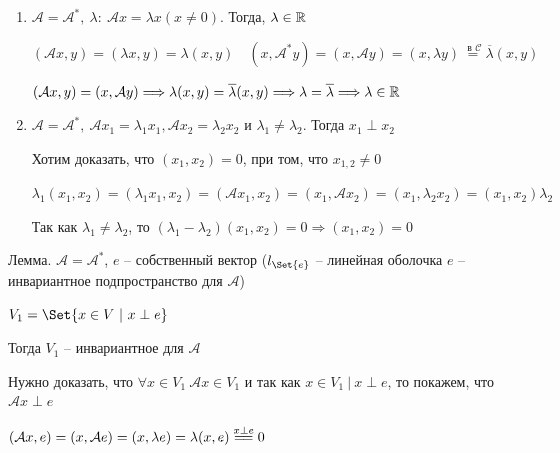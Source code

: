 \documentclass[12pt]{article}
\begin{document}
    \begin{enumerate}
        \item $\mathcal{A} = \mathcal{A}^*, \ \lambda : \ \mathcal{A}x = \lambda x (x \neq 0)$. Тогда, $\lambda \in \mathbb{R}$

        \begin{MyProof}
            $(\mathcal{A}x, y) = (\lambda x, y) = \lambda (x, y) \quad (x, \mathcal{A}^* y) = (x, \mathcal{A}y) = (x, \lambda y) \stackrel{\text{ в } \mathcal{C}}{=} \overline{\lambda} (x, y)$

            $(\mathcal{A}x, y) = (x, \mathcal{A}y) \Longrightarrow \lambda (x, y) = \overline{\lambda} (x, y) \Longrightarrow \lambda = \overline{\lambda} \Longrightarrow \lambda \in \mathbb{R}$

        \end{MyProof}

        \item $\mathcal{A} = \mathcal{A}^*, \ \mathcal{A}x_1 = \lambda_1 x_1, \mathcal{A}x_2 = \lambda_2 x_2$ и $\lambda_1 \neq \lambda_2$.
        Тогда $x_1 \perp x_2$

        \begin{MyProof}
            Хотим доказать, что $(x_1, x_2) = 0$, при том, что $x_{1,2} \neq 0$

            $\lambda_1 (x_1, x_2) = (\lambda_1 x_1, x_2) = (\mathcal{A} x_1, x_2) = (x_1, \mathcal{A} x_2) = (x_1, \lambda_2 x_2) = (x_1, x_2) \lambda_2$

            Так как $\lambda_1 \neq \lambda_2$, то $(\lambda_1 - \lambda_2) (x_1, x_2) = 0 \Longrightarrow (x_1, x_2) = 0$
        \end{MyProof}
    \end{enumerate}

    \hypertarget{lemmaabouteigenvectors}{}

    \begin{MyTheorem}
        \Ths Лемма. $\mathcal{A} = \mathcal{A}^*$, $e$ -- собственный вектор ($l_{\Set{e}}$ -- линейная оболочка $e$ -- инвариантное подпространство для $\mathcal{A}$)

        $V_1 = \Set{x \in V \ | \ x \perp e}$

        Тогда $V_1$ -- инвариантное для $\mathcal{A}$
    \end{MyTheorem}

    \begin{MyProof}
        Нужно доказать, что $\forall x \in V_1 \ \mathcal{A}x \in V_1$ и так как $x \in V_1 \ | \ x \perp e$, то
        покажем, что $\mathcal{A}x \perp e$

        $(\mathcal{A}x, e) = (x, \mathcal{A}e) = (x, \lambda e) = \lambda (x, e) \stackrel{x \perp e}{=\joinrel=} 0$
    \end{MyProof}
\end{document}
